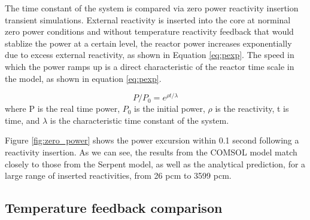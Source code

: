 \documentclass{elsarticle}
\begin{document}
The time constant of the system is compared via zero power reactivity insertion transient simulations. External reactivity is inserted into the core at norminal zero power conditions and without temperature reactivity feedback that would stablize the power at a certain level, the reactor power increases exponentially due to excess external reactivity, as shown in Equation \ref{eq:pexp}. 
The speed in which the power ramps up is a direct characteristic of the reactor time scale in the model, as shown in equation \ref{eq:pexp}. 

\begin{equation}
P/P_0 =  e^{\rho t/\lambda}
\label{eq:pexp}
\end{equation}
where P is the real time power, $P_0$ is the initial power, $\rho$ is the reactivity, t is time, and $\lambda$ is the characteristic time constant of the system. 

Figure \ref{fig:zero_power} shows the power excursion within 0.1 second following a reactivity insertion.
As we can see, the results from the COMSOL model match closely to those from the Serpent model, as well as the analytical prediction, for a large range of inserted reactivities, from 26 pcm to 3599 pcm.  






\subsection{Temperature feedback comparison}
\label{sec:feedback}
\end{document}
